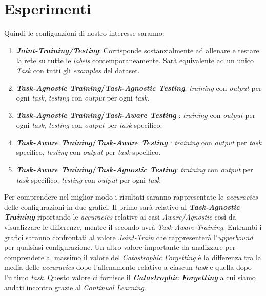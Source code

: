 \section{Esperimenti}
Quindi le configuazioni di nostro interesse saranno:
\begin{enumerate}
     \item \textbf{\textit{Joint-Training/Testing}}: Corrisponde sostanzialmente ad allenare e testare la rete su tutte le \textit{labels} contemporaneamente. Sarà equivalente ad un unico \textit{Task} con tutti gli \textit{examples} del dataset.
    
    \item \textbf{\textit{Task-Agnostic Training}/\textit{Task-Agnostic Testing}}: \textit{training} con \textit{output} per ogni \textit{task}, \textit{testing} con \textit{output} per ogni \textit{task}.  
    
    \item \textbf{ \textit{Task-Agnostic Training}/\textit{Task-Aware Testing}} : \textit{training} con \textit{output} per ogni \textit{task}, \textit{testing} con \textit{output} per \textit{task} specifico.
    
    \item \textbf{\textit{Task-Aware Training}/\textit{Task-Aware Testing}} : \textit{training} con \textit{output} per \textit{task} specifico, \textit{testing} con \textit{output} per \textit{task} specifico. 
    
    \item \textbf{\textit{Task-Aware Training}/\textit{Task-Agnostic Testing}}: \textit{training} con \textit{output} per \textit{task} specifico, \textit{testing} con \textit{output} per ogni \textit{task}  
\end{enumerate}
Per comprendere nel miglior modo i risultati saranno  rappresentate le \textit{accuracies} delle configurazioni in due grafici. Il primo sarà relativo al \textbf{\textit{Task-Agnostic Training}} riportando le \textit{accuracies} relative ai casi \textit{Aware/Agnostic} così da visualizzare le differenze, mentre il secondo avrà \textit{Task-Aware Training}. Entrambi i grafici saranno confrontati al valore \textit{Joint-Train} che rappresenterà l'\textit{upperbound} per qualsiasi configurazione. \newline
Un altro valore importante da analizzare per comprendere al massimo il valore del \textit{Catastrophic Forgetting} è la differenza tra la media delle \textit{accuracies} dopo l'allenamento relativo a ciascun \textit{task} e quella dopo l'ultimo \textit{task}. Questo valore ci fornisce il \textbf{\textit{Catastrophic Forgetting}} a cui siamo andati incontro grazie al \textit{Continual Learning}.
\newpage

